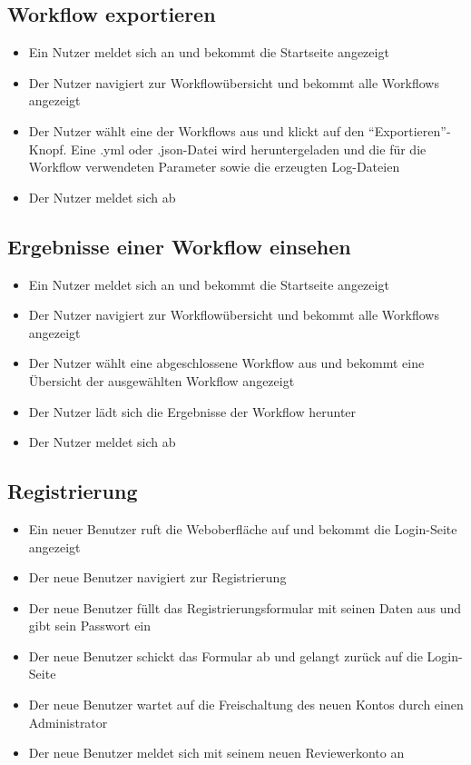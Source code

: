 \subsection*{\gls{Workflow} exportieren}
\begin{itemize}
    \item Ein \gls{Nutzer} meldet sich an und bekommt die Startseite angezeigt
    \item Der \gls{Nutzer} navigiert zur Workflowübersicht und bekommt alle Workflows angezeigt
    \item Der \gls{Nutzer} wählt eine der \glspl{Workflow} aus und klickt auf den \enquote{Exportieren}-Knopf. Eine .yml oder .json-Datei wird heruntergeladen und die für die \gls{Workflow} verwendeten Parameter sowie die erzeugten Log-Dateien
    \item Der \gls{Nutzer} meldet sich ab
\end{itemize}

\subsection*{Ergebnisse einer \gls{Workflow} einsehen}
\begin{itemize}
    \item Ein \gls{Nutzer} meldet sich an und bekommt die Startseite angezeigt
    \item Der \gls{Nutzer} navigiert zur Workflowübersicht und bekommt alle Workflows angezeigt
    \item Der \gls{Nutzer} wählt eine abgeschlossene \gls{Workflow} aus und bekommt eine Übersicht der ausgewählten \gls{Workflow} angezeigt
    \item Der \gls{Nutzer} lädt sich die Ergebnisse der \gls{Workflow} herunter
    \item Der \gls{Nutzer} meldet sich ab
\end{itemize}



\subsection*{Registrierung}
\begin{itemize}
    \item Ein neuer Benutzer ruft die Weboberfläche auf und bekommt die Login-Seite angezeigt
    \item Der neue Benutzer navigiert zur Registrierung
    \item Der neue Benutzer füllt das Registrierungsformular mit seinen Daten aus und gibt sein Passwort ein
    \item Der neue Benutzer schickt das Formular ab und gelangt zurück auf die Login-Seite
    \item Der neue Benutzer wartet auf die Freischaltung des neuen Kontos durch einen Administrator
    \item Der neue Benutzer meldet sich mit seinem neuen \Gls{Reviewer}konto an %
\end{itemize}

